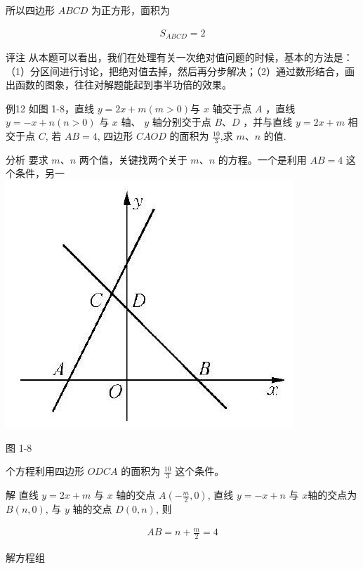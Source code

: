 \documentclass[10pt]{article}
\begin{document}
所以四边形 $A B C D$ 为正方形，面积为

\begin{align*}
S_{A B C D}=2
\end{align*}

评注 从本题可以看出，我们在处理有关一次绝对值问题的时候，基本的方法是：（1）分区间进行讨论，把绝对值去掉，然后再分步解决；（2）通过数形结合，画出函数的图象，往往对解题能起到事半功倍的效果。

例12 如图 1-8，直线 $y=2 x+m(m>0)$与 $x$ 轴交于点 $A$ ，直线 $y=-x+n(n>0)$ 与 $x$ 轴、 $y$ 轴分别交于点 $B 、 D$ ，并与直线 $y=2 x+m$ 相交于点 $C$, 若 $A B=4$, 四边形 $C A O D$ 的面积为 $\frac{10}{3}$,求 $m 、 n$ 的值.

分析 要求 $m 、 n$ 两个值，关键找两个关于 $m 、 n$ 的方程。一个是利用 $A B=4$ 这个条件，另一\\
\includegraphics[max width=\textwidth, center]{2024_10_30_1bf34f7aeb61f11d11d3g-018}

图 1-8

个方程利用四边形 $O D C A$ 的面积为 $\frac{10}{3}$ 这个条件。

解 直线 $y=2 x+m$ 与 $x$ 轴的交点 $A\left(-\frac{m}{2}, 0\right)$, 直线 $y=-x+n$ 与 $x$轴的交点为 $B(n, 0)$, 与 $y$ 轴的交点 $D(0, n)$, 则

\begin{align*}
A B=n+\frac{m}{2}=4 \tag{1}
\end{align*}

解方程组
\end{document}
